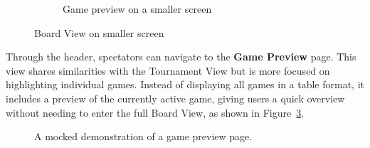 \begin{figure}[h!]
\begin{subfigure}[h!]{0.4\linewidth}
        \caption{Game preview on a smaller screen}
        \label{fig:small-game-preview}
    \end{subfigure}
    \caption{Board View on smaller screen}
    \label{fig:small-view-game-preview-group}
\end{figure}

Through the header, spectators can navigate to the \textbf{Game Preview} page. This view shares similarities with the Tournament View but is more focused on highlighting individual games. Instead of displaying all games in a table format, it includes a preview of the currently active game, giving users a quick overview without needing to enter the full Board View, as shown in Figure~\ref{fig:game-preview}.

\begin{figure}[h!] \centering {}\caption[Preview of active games]{A mocked demonstration of a game preview page.}\label{fig:game-preview} \end{figure}

